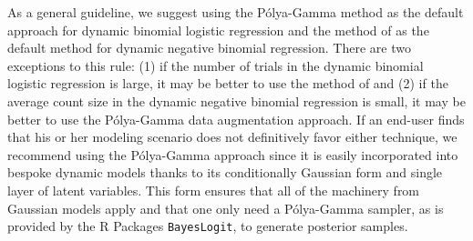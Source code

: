 \documentclass[12pt]{article}
\newcommand{\Polya}{P\'{o}lya}
\begin{document}
As a general guideline, we suggest using the \Polya-Gamma method as the default
approach for dynamic binomial logistic regression and the method of
\cite{fruhwirth-schnatter-etal-2009} as the default method for dynamic negative
binomial regression.  There are two exceptions to this rule: (1) if the number
of trials in the dynamic binomial logistic regression is large, it may be better
to use the method of \cite{fussl-etal-2013} and (2) if the average count size in
the dynamic negative binomial regression is small, it may be better to use the
\Polya-Gamma data augmentation approach.  If an end-user finds that his or her
modeling scenario does not definitively favor either technique, we recommend
using the \Polya-Gamma approach since it is easily incorporated into bespoke
dynamic models thanks to its conditionally Gaussian form and single layer of
latent variables.  This form ensures that all of the machinery from Gaussian
models apply and that one only need a \Polya-Gamma sampler, as is provided by
the R Packages \texttt{BayesLogit}, to generate posterior samples.

\appendix



\end{document}
